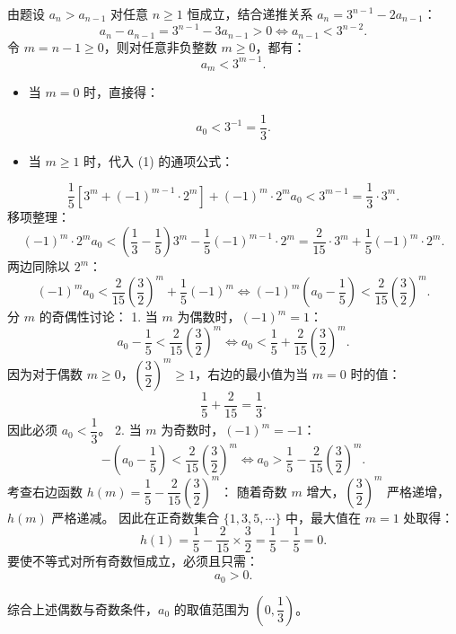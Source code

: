 \begin{answer}
由题设 $a_n > a_{n-1}$ 对任意 $n \ge 1$ 恒成立，结合递推关系 $a_n = 3^{n-1} - 2a_{n-1}$：
\nopagebreak[4]
\[a_n - a_{n-1} = 3^{n-1} - 3a_{n-1} > 0 \iff a_{n-1} < 3^{n-2}.\]
令 $m = n - 1 \ge 0$，则对任意非负整数 $m \ge 0$，都有：
\nopagebreak[4]
\[a_m < 3^{m-1}.\]
\begin{itemize}
\item 当 $m = 0$ 时，直接得：
\end{itemize}
\nopagebreak[4]
\[a_0 < 3^{-1} = \frac{1}{3}.\]
\begin{itemize}
\item 当 $m \ge 1$ 时，代入 (1) 的通项公式：
\end{itemize}
\nopagebreak[4]
\[\frac{1}{5}[3^m + (-1)^{m-1} \cdot 2^m] + (-1)^m \cdot 2^m a_0 < 3^{m-1} = \frac{1}{3}\cdot 3^m.\]
  移项整理：
\nopagebreak[4]
\[(-1)^m \cdot 2^m a_0 < \left(\frac{1}{3} - \frac{1}{5}\right) 3^m - \frac{1}{5}(-1)^{m-1}\cdot 2^m = \frac{2}{15}\cdot 3^m + \frac{1}{5}(-1)^m \cdot 2^m.\]
  两边同除以 $2^m$：
\nopagebreak[4]
\[(-1)^m a_0 < \frac{2}{15}\left(\frac{3}{2}\right)^m + \frac{1}{5}(-1)^m \iff (-1)^m \left(a_0 - \frac{1}{5}\right) < \frac{2}{15}\left(\frac{3}{2}\right)^m.\]
分 $m$ 的奇偶性讨论：
1. 当 $m$ 为偶数时，$(-1)^m = 1$：
\nopagebreak[4]
\[a_0 - \frac{1}{5} < \frac{2}{15}\left(\frac{3}{2}\right)^m \iff a_0 < \frac{1}{5} + \frac{2}{15}\left(\frac{3}{2}\right)^m.\]
   因为对于偶数 $m \ge 0$，$\left(\dfrac{3}{2}\right)^m \ge 1$，右边的最小值为当 $m = 0$ 时的值：
\nopagebreak[4]
\[\frac{1}{5} + \frac{2}{15} = \frac{1}{3}.\]
   因此必须 $a_0 < \dfrac{1}{3}$。
2. 当 $m$ 为奇数时，$(-1)^m = -1$：
\nopagebreak[4]
\[-\left(a_0 - \frac{1}{5}\right) < \frac{2}{15}\left(\frac{3}{2}\right)^m \iff a_0 > \frac{1}{5} - \frac{2}{15}\left(\frac{3}{2}\right)^m.\]
   考查右边函数 $h(m) = \dfrac{1}{5} - \dfrac{2}{15}\left(\dfrac{3}{2}\right)^m$：
   随着奇数 $m$ 增大，$\left(\dfrac{3}{2}\right)^m$ 严格递增，$h(m)$ 严格递减。
   因此在正奇数集合 $\{1, 3, 5, \cdots\}$ 中，最大值在 $m = 1$ 处取得：
\nopagebreak[4]
\[h(1) = \frac{1}{5} - \frac{2}{15} \times \frac{3}{2} = \frac{1}{5} - \frac{1}{5} = 0.\]
   要使不等式对所有奇数恒成立，必须且只需：
\nopagebreak[4]
\[a_0 > 0.\]

综合上述偶数与奇数条件，$a_0$ 的取值范围为 $\left(0, \dfrac{1}{3}\right)$。



\end{answer}
